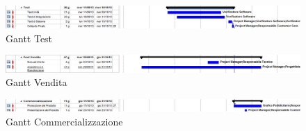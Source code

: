 \begin{figure}[H]
\begin{center}
\includegraphics[width=1\textwidth]{img/G-A Test.jpg}
\caption{Gantt Test}
\label{fig:Gantt Test}
\end{center}
\end{figure}

\begin{figure}[H]
\begin{center}
\includegraphics[width=1\textwidth]{img/G-A Vendita.jpg}
\caption{Gantt Vendita}
\label{fig:Gantt Vendita}
\end{center}
\end{figure}

\begin{figure}[H]
\begin{center}
\includegraphics[width=1\textwidth]{img/G-A Commercializzazione.jpg}
\caption{Gantt Commercializzazione}
\label{fig:Gantt Commercializzazione}
\end{center}
\end{figure}